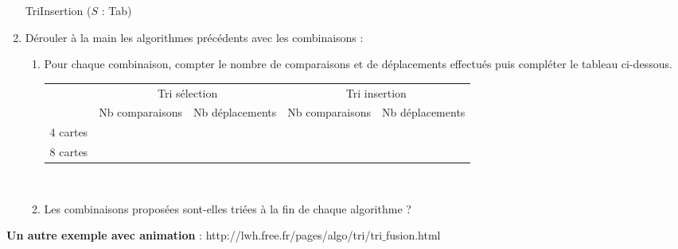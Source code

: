 \documentclass[a4paper,french]{article}
\begin{document}
\begin{enumerate}
\begin{algorithm}[H]
\DontPrintSemicolon
TriInsertion ($S$ : Tab)\;
\BlankLine
\DontPrintSemicolon
{}
\PrintSemicolon
\BlankLine 
\Deb{
\BlankLine
\BlankLine
\BlankLine
\BlankLine
\BlankLine
\BlankLine
\BlankLine
\BlankLine
\BlankLine
\BlankLine
\BlankLine
\BlankLine
\BlankLine
\BlankLine
\BlankLine
\BlankLine
\BlankLine
\BlankLine
\BlankLine
\BlankLine
\BlankLine
\BlankLine
\BlankLine
\BlankLine
\BlankLine
\BlankLine
\BlankLine
\BlankLine
\BlankLine
\BlankLine
\BlankLine
\BlankLine
\BlankLine
\BlankLine
\BlankLine
\BlankLine
\BlankLine
\BlankLine
\BlankLine
\BlankLine
\BlankLine
\BlankLine
\BlankLine
\BlankLine
\BlankLine
\BlankLine
\BlankLine
\BlankLine
\BlankLine
\BlankLine
\BlankLine
\BlankLine
\BlankLine
\BlankLine
\BlankLine
\BlankLine
\BlankLine
\BlankLine
\BlankLine
\BlankLine
\BlankLine
\BlankLine
\BlankLine
\BlankLine
\BlankLine
\BlankLine
\BlankLine
\BlankLine
\BlankLine
\BlankLine
\BlankLine
\BlankLine
\BlankLine
\BlankLine
\BlankLine
\BlankLine
\BlankLine
\BlankLine
\BlankLine
\BlankLine
\BlankLine
\BlankLine
\BlankLine
\BlankLine
\BlankLine
\BlankLine
\BlankLine
\BlankLine
\BlankLine
}
\end{algorithm}
\medskip

\item Dérouler \og à la main \fg les algorithmes précédents avec les combinaisons :

\begin{enumerate}
\item Pour chaque combinaison, compter le nombre de comparaisons et de déplacements effectués puis compléter le tableau ci-dessous.

\setlength{\extrarowheight}{2mm}
\begin{tabular}{|c|c|c|c|c|}
\cline{2-5}
\multicolumn{1}{c|}{} &\multicolumn{2}{|c|}{Tri sélection} & \multicolumn{2}{|c|}{Tri insertion}
\\ \cline{2-5}
\multicolumn{1}{c|}{}  & Nb comparaisons & Nb déplacements & Nb comparaisons & Nb déplacements \\
\hline
4 cartes &  &   &   &   \\[2mm] \hline
8 cartes &   &   &   &   \\[2mm] \hline
\end{tabular}
\\[2mm]
\item Les combinaisons proposées sont-elles triées à la fin de chaque algorithme ?
\end{enumerate}

\end{enumerate}

\pagebreak



\textbf{Un autre exemple avec animation} : http://lwh.free.fr/pages/algo/tri/tri$\_$fusion.html
\end{document}
